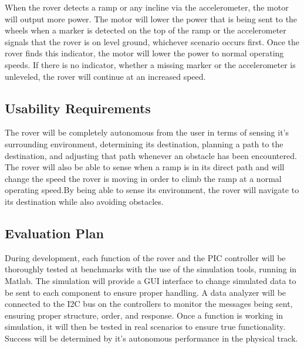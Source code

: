 When the rover detects a ramp or any incline via the accelerometer, the motor will output more power. The motor will lower the power that is being sent to the wheels when a marker is detected on the top of the ramp or the accelerometer signals that the rover is on level ground, whichever scenario occurs first. Once the rover finds this indicator, the motor will lower the power to normal operating speeds. If there is no indicator, whether a missing marker or the accelerometer is unleveled, the rover will continue at an increased speed.

\subsection*{Usability Requirements}
The rover will be completely autonomous from the user in terms of sensing it’s surrounding environment, determining its destination, planning a path to the destination, and adjusting that path whenever an obstacle has been encountered. The rover will also be able to sense when a ramp is in its direct path and will change the speed the rover is moving in order to climb the ramp at a normal operating speed.By being able to sense its environment, the rover will navigate to its destination while also avoiding obstacles. 

\subsection*{Evaluation Plan}
During development, each function of the rover and the PIC controller will be thoroughly tested at benchmarks with the use of the simulation tools, running in Matlab. The simulation will provide a GUI interface to change simulated data to be sent to each component to ensure proper handling. A data analyzer will be connected to the I2C bus on the controllers to monitor the messages being sent, ensuring proper structure, order, and response. Once a function is working in simulation, it will then be tested in real scenarios to ensure true functionality. Success will be determined by it's autonomous performance in the physical track.



